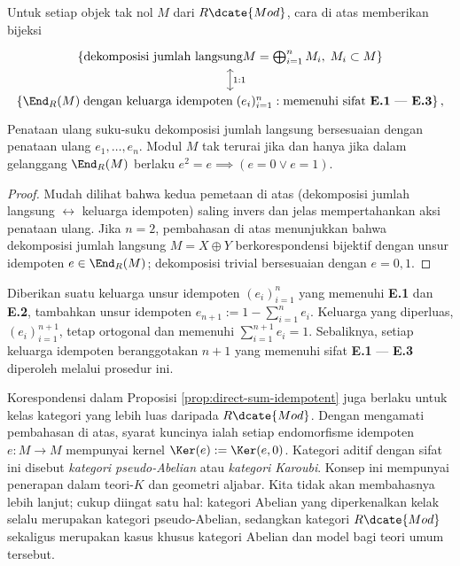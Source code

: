 \begin{proposition}\label{prop:direct-sum-idempotent}
	Untuk setiap objek tak nol $M$ dari $R\dcate{Mod}$, cara di atas memberikan bijeksi
	\[\begin{tikzcd}
		\left\{ \text{dekomposisi jumlah langsung} M = \bigoplus_{i=1}^n M_i, \; M_i \subset M \right\} \arrow[leftrightarrow, d, "1:1"] \\
		\left\{ \End_R(M)\; \text{dengan keluarga idempoten}\; (e_i)_{i=1}^n : \text{memenuhi sifat \textbf{E.1} --- \textbf{E.3}} \right\},
	\end{tikzcd}\]
Penataan ulang suku-suku dekomposisi jumlah langsung bersesuaian dengan penataan ulang $e_1, \ldots, e_n$. Modul $M$ tak terurai jika dan hanya jika dalam gelanggang $\End_R(M)$ berlaku $e^2 = e \implies (e=0 \vee e=1)$.
\end{proposition}
\begin{proof}
	Mudah dilihat bahwa kedua pemetaan di atas (dekomposisi jumlah langsung $\leftrightarrow$ keluarga idempoten) saling invers dan jelas mempertahankan aksi penataan ulang. Jika $n=2$, pembahasan di atas menunjukkan bahwa dekomposisi jumlah langsung $M = X \oplus Y$ berkorespondensi bijektif dengan unsur idempoten $e \in \End_R(M)$; dekomposisi trivial bersesuaian dengan $e = 0,1$.
\end{proof}
Diberikan suatu keluarga unsur idempoten $(e_i)_{i=1}^n$ yang memenuhi \textbf{E.1} dan \textbf{E.2}, tambahkan unsur idempoten $e_{n+1} := 1 - \sum_{i=1}^n e_i$. Keluarga yang diperluas, $(e_i)_{i=1}^{n+1}$, tetap ortogonal dan memenuhi $\sum_{i=1}^{n+1} e_i = 1$. Sebaliknya, setiap keluarga idempoten beranggotakan $n+1$ yang memenuhi sifat \textbf{E.1} --- \textbf{E.3} diperoleh melalui prosedur ini.

\begin{remark}
	Korespondensi dalam Proposisi \ref{prop:direct-sum-idempotent} juga berlaku untuk kelas kategori yang lebih luas daripada $R\dcate{Mod}$. Dengan mengamati pembahasan di atas, syarat kuncinya ialah setiap endomorfisme idempoten $e: M \to M$ mempunyai kernel $\Ker(e) := \Ker(e,0)$. Kategori aditif dengan sifat ini disebut \emph{kategori pseudo-Abelian} atau \emph{kategori Karoubi}. Konsep ini mempunyai penerapan dalam teori-$K$ dan geometri aljabar. Kita tidak akan membahasnya lebih lanjut; cukup diingat satu hal: kategori Abelian yang diperkenalkan kelak selalu merupakan kategori pseudo-Abelian, sedangkan kategori $R\dcate{Mod}$ sekaligus merupakan kasus khusus kategori Abelian dan model bagi teori umum tersebut.
\end{remark}

